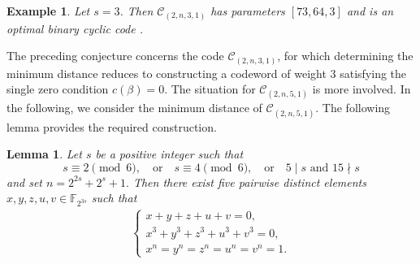 \documentclass[12pt,draftcls,journal,onecolumn]{IEEEtran}
\newtheorem{lemma}[theorem]{Lemma}
\newtheorem{example}[theorem]{Example}
\begin{document}
\begin{example}
Let \( s = 3 \). Then \( \mathcal{C}_{(2,n,3,1)} \) has parameters \([73,64,3]\) and is an optimal binary cyclic code \cite[Appendix A]{DingP1}.
\end{example}


The preceding conjecture concerns the code \(\mathcal{C}_{(2,n,3,1)}\), for which determining the minimum distance reduces to constructing a codeword of weight \(3\) satisfying the single zero condition \(c(\beta)=0\). The situation for \(\mathcal{C}_{(2,n,5,1)}\) is more involved. In the following, we consider the minimum distance of \(\mathcal{C}_{(2,n,5,1)}\). The following lemma provides the required construction.


\begin{lemma}\label{lem:V1I}
Let \(s\) be a positive integer such that
\[
s\equiv 2 \pmod 6,
\quad\text{or}\quad
s\equiv 4 \pmod 6,
\quad\text{or}\quad 5\mid s
\,\,\text{and}\,\,
15\nmid s
\]
and set
$
n=2^{2s}+2^s+1.
$
Then there exist five pairwise distinct elements
$
x,y,z,u,v\in \mathbb F_{2^{3s}}
$
such that
\begin{eqnarray*}
\begin{cases}
x+y+z+u+v=0,  \\
x^3+y^3+z^3+u^3+v^3=0,\\
x^n=y^n=z^n=u^n=v^n=1.
\end{cases}
\end{eqnarray*}
\end{lemma}
\end{document}
